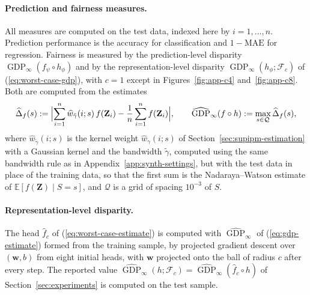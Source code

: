 \documentclass{article} %
\begin{document}
\paragraph{Prediction and fairness measures.}  All measures are computed on the test data, indexed here by $i=1,\ldots,n$.  Prediction performance is the accuracy for classification and $1-\mathrm{MAE}$ for regression.  Fairness is measured by the prediction-level disparity $\operatorname{GDP}_{\infty}(f_{\psi}\circ h_{\phi})$ and by the representation-level disparity $\operatorname{GDP}_{\infty}(h_{\phi};\mathcal{F}_c)$ of (\ref{eq:worst-case-gdp}), with $c=1$ except in Figures~\ref{fig:app-c4} and~\ref{fig:app-c8}.  Both are computed from the estimates
\begin{equation}
  \widehat{\Delta}_{f}(s):=\Bigl|\sum_{i=1}^{n}\widehat{w}_{\tilde{\gamma}}(i;s)\,f(\mathbf{Z}_i)-\frac{1}{n}\sum_{i=1}^{n}f(\mathbf{Z}_i)\Bigr|,
  \qquad
  \widehat{\operatorname{GDP}}_{\infty}(f\circ h):=\max_{s\in\mathcal{Q}}\widehat{\Delta}_{f}(s),
  \label{eq:gdp-estimate}
\end{equation}
where $\widehat{w}_{\tilde{\gamma}}(i;s)$ is the kernel weight $\widehat{w}_{\gamma}(i;s)$ of Section~\ref{sec:supipm-estimation} with a Gaussian kernel and the bandwidth $\tilde{\gamma}$, computed using the same bandwidth rule as in Appendix~\ref{app:synth-settings}, but with the test data in place of the training data, so that the first sum is the Nadaraya--Watson estimate of $\mathbb{E}[f(\mathbf{Z})\mid S=s]$, and $\mathcal{Q}$ is a grid of spacing $10^{-3}$ of $S$.


\paragraph{Representation-level disparity.}  The head $\hat{f}_c$ of (\ref{eq:worst-case-estimate}) is computed with $\widehat{\operatorname{GDP}}_{\infty}$ of (\ref{eq:gdp-estimate}) formed from the training sample, by projected gradient descent over $(\mathbf{w},b)$ from eight initial heads, with $\mathbf{w}$ projected onto the ball of radius $c$ after every step.  The reported value $\widehat{\operatorname{GDP}}_{\infty}(h;\mathcal{F}_c)=\widehat{\operatorname{GDP}}_{\infty}(\hat{f}_c\circ h)$ of Section~\ref{sec:experiments} is computed on the test sample.
\end{document}
